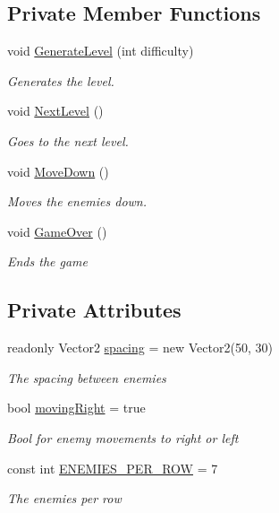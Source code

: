 \subsection*{Private Member Functions}
\begin{DoxyCompactItemize}
\item 
void \hyperlink{classXaria_1_1Level_a22bccc0212af3ebce89ad36a735cf2f1}{Generate\+Level} (int difficulty)
\begin{DoxyCompactList}\small\item\em Generates the level. \end{DoxyCompactList}\item 
void \hyperlink{classXaria_1_1Level_ab1b45e8eacae455500518158aceadeba}{Next\+Level} ()
\begin{DoxyCompactList}\small\item\em Goes to the next level. \end{DoxyCompactList}\item 
void \hyperlink{classXaria_1_1Level_a501e6c0c3196d7cff51e14f57775a15e}{Move\+Down} ()
\begin{DoxyCompactList}\small\item\em Moves the enemies down. \end{DoxyCompactList}\item 
void \hyperlink{classXaria_1_1Level_aca4ebca18f725704744d9c51073a44a5}{Game\+Over} ()
\begin{DoxyCompactList}\small\item\em Ends the game \end{DoxyCompactList}\end{DoxyCompactItemize}
\subsection*{Private Attributes}
\begin{DoxyCompactItemize}
\item 
readonly Vector2 \hyperlink{classXaria_1_1Level_a11828cb0f191abce748eccf9921cf83a}{spacing} = new Vector2(50, 30)
\begin{DoxyCompactList}\small\item\em The spacing between enemies \end{DoxyCompactList}\item 
bool \hyperlink{classXaria_1_1Level_accc50b8872895d856609c939069d86df}{moving\+Right} = true
\begin{DoxyCompactList}\small\item\em Bool for enemy movements to right or left \end{DoxyCompactList}\item 
const int \hyperlink{classXaria_1_1Level_afd8806018ddf8b47dbec8a495ed8e3b4}{E\+N\+E\+M\+I\+E\+S\+\_\+\+P\+E\+R\+\_\+\+R\+OW} = 7
\begin{DoxyCompactList}\small\item\em The enemies per row \end{DoxyCompactList}\end{DoxyCompactItemize}



